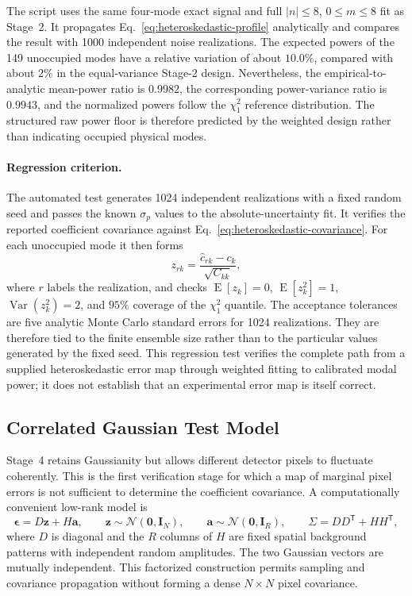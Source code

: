\documentclass[aps,prb,preprint,onecolumn,notitlepage,amsmath,amssymb,
  superscriptaddress,floatfix]{revtex4-2}
\newcommand{\trans}{\mathsf{T}}
\begin{document}
The script  uses the same
four-mode exact signal and full $|n|\leq8$, $0\leq m\leq8$ fit as Stage~2.
It propagates Eq.~\eqref{eq:heteroskedastic-profile} analytically and compares
the result with 1000 independent noise realizations.  The expected powers of
the 149 unoccupied modes have a relative variation of about $10.0\%$, compared
with about $2\%$ in the equal-variance Stage-2 design.  Nevertheless, the
empirical-to-analytic mean-power ratio is $0.9982$, the corresponding
power-variance ratio is $0.9943$, and the normalized powers follow the
$\chi_1^2$ reference distribution.  The structured raw power floor is
therefore predicted by the weighted design rather than indicating occupied
physical modes.

\paragraph{Regression criterion.}
The automated test  generates 1024
independent realizations with a fixed random seed and passes the known
$\sigma_p$ values to the absolute-uncertainty fit.  It verifies the reported
coefficient covariance against Eq.~\eqref{eq:heteroskedastic-covariance}.  For
each unoccupied mode it then forms
\begin{equation}
 z_{rk}=\frac{\widehat c_{rk}-c_k}{\sqrt{C_{kk}}},
 \label{eq:heteroskedastic-standardized-error}
\end{equation}
where $r$ labels the realization, and checks
$\operatorname{E}[z_k]=0$, $\operatorname{E}[z_k^2]=1$,
$\operatorname{Var}(z_k^2)=2$, and $95\%$ coverage of the
$\chi_1^2$ quantile.  The acceptance tolerances are five analytic Monte Carlo
standard errors for 1024 realizations.  They are therefore tied to the finite
ensemble size rather than to the particular values generated by the fixed
seed.  This regression test verifies the complete path from a supplied
heteroskedastic error map through weighted fitting to calibrated modal power;
it does not establish that an experimental error map is itself correct.

\subsection{Correlated Gaussian Test Model}

Stage~4 retains Gaussianity but allows different detector pixels to fluctuate
coherently.  This is the first verification stage for which a map of marginal
pixel errors is not sufficient to determine the coefficient covariance.  A
computationally convenient low-rank model is
\begin{equation}
 \bm\epsilon=D\bm z+H\bm a,
 \qquad
 \bm z\sim\mathcal{N}(\bm0,\mathbf I_N),
 \qquad
 \bm a\sim\mathcal{N}(\bm0,\mathbf I_R),
 \qquad
 \Sigma=DD^{\trans}+HH^{\trans},
 \label{eq:correlated-model}
\end{equation}
where $D$ is diagonal and the $R$ columns of $H$ are fixed spatial
background patterns with independent random amplitudes.  The two Gaussian
vectors are mutually independent.  This factorized construction permits
sampling and covariance propagation without forming a dense $N\times N$
pixel covariance.
\end{document}
